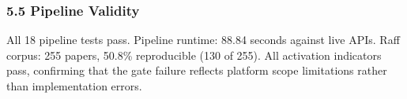 \subsubsection{5.5 Pipeline Validity}

\begin{table}[htbp]
\centering
{}
\end{table}

All 18 pipeline tests pass. Pipeline runtime: 88.84 seconds against live APIs. Raff corpus: 255 papers, 50.8\% reproducible (130 of 255). All activation indicators pass, confirming that the gate failure reflects platform scope limitations rather than implementation errors.

